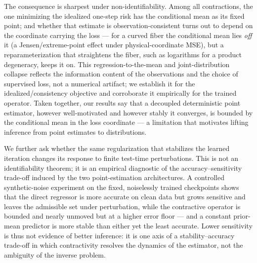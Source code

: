 The consequence is sharpest under non-identifiability. Among all contractions, the one minimizing the idealized one-step risk has the conditional mean as its fixed point; and whether that estimate is observation-consistent turns out to depend on the coordinate carrying the loss --- for a curved fiber the conditional mean lies \emph{off} it (a Jensen/extreme-point effect under physical-coordinate MSE), but a reparameterization that straightens the fiber, such as logarithms for a product degeneracy, keeps it on. This regression-to-the-mean and joint-distribution collapse reflects the information content of the observations and the choice of supervised loss, not a numerical artifact; we establish it for the idealized/consistency objective and corroborate it empirically for the trained operator. Taken together, our results say that a decoupled deterministic point estimator, however well-motivated and however stably it converges, is bounded by the conditional mean in the loss coordinate --- a limitation that motivates lifting inference from point estimates to distributions.

We further ask whether the same regularization that stabilizes the learned iteration changes its response to finite test-time perturbations. This is not an identifiability theorem; it is an empirical diagnostic of the accuracy--sensitivity trade-off induced by the two point-estimation architectures. A controlled synthetic-noise experiment on the fixed, noiselessly trained checkpoints shows that the direct regressor is more accurate on clean data but grows sensitive and leaves the admissible set under perturbation, while the contractive operator is bounded and nearly unmoved but at a higher error floor --- and a constant prior-mean predictor is more stable than either yet the least accurate. Lower sensitivity is thus not evidence of better inference: it is one axis of a stability--accuracy trade-off in which contractivity resolves the dynamics of the estimator, not the ambiguity of the inverse problem.

